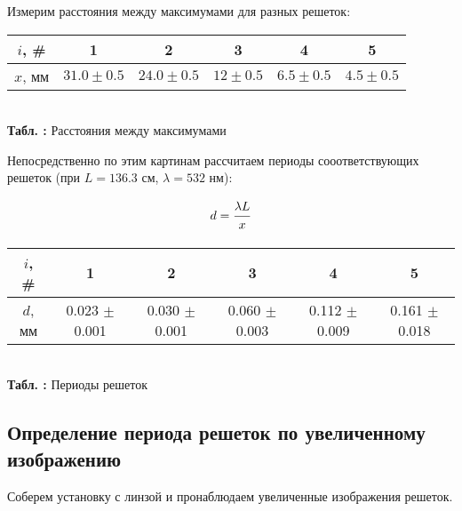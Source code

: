 \documentclass[12pt,a4paper]{article}
\newcommand{\sfrac}[2]{\dfrac{\strut #1}{\strut #2}}
\newcounter{tbl}
\newcommand{\embedtbl}[3]{\begin{center}
		\begin{tabular}{#1}
			#2
		\end{tabular}
		\\\textbf{Табл. \thetbl:} #3
		\label{tbl_\thetbl}
		\addtocounter{tbl}{1}
\end{center}}
\begin{document}
	Измерим расстояния между максимумами для разных решеток:
	
	\embedtbl{|c||c|c|c|c|c|}{
		\hline
		$i$, \#  & 1 & 2 & 3 & 4 & 5
		\\\hline
		$x$, мм & $31.0 \pm 0.5$ & $24.0 \pm 0.5$ & $12 \pm 0.5$ & $6.5 \pm 0.5$ & $4.5 \pm 0.5$
		\\\hline
	}{Расстояния между максимумами}
	
	Непосредственно по этим картинам рассчитаем периоды сооответствующих решеток (при $L = 136.3$ см, $\lambda = 532$ нм):
	
	$$d = \sfrac{\lambda L}{x}$$
	
	\embedtbl{|c||c|c|c|c|c|}{
		\hline
		$i$, \# & 1 & 2 & 3 & 4 & 5
		\\\hline
		$d$, мм & 0.023 $\pm$ 0.001 & 0.030 $\pm$ 0.001 & 0.060 $\pm$ 0.003 & 0.112 $\pm$ 0.009 & 0.161 $\pm$ 0.018
		\\\hline
	}{Периоды решеток}

	\subsection{Определение периода решеток по увеличенному изображению}
	
	Соберем установку с линзой и пронаблюдаем увеличенные изображения решеток.
	
\end{document}

